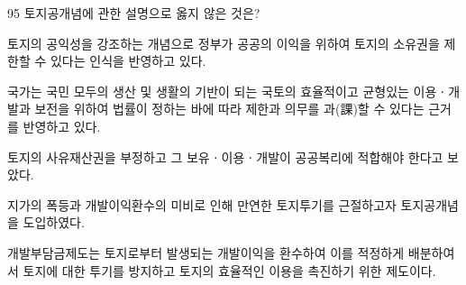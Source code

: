\begin{question}{95}
토지공개념에 관한 설명으로 옳지 않은 것은?
\begin{choices}
  \item 토지의 공익성을 강조하는 개념으로 정부가 공공의 이익을 위하여 토지의 소유권을 제한할 수 있다는 인식을 반영하고 있다.
  \item 국가는 국민 모두의 생산 및 생활의 기반이 되는 국토의 효율적이고 균형있는 이용ㆍ개발과 보전을 위하여 법률이 정하는 바에 따라 제한과 의무를 과(課)할 수 있다는 근거를 반영하고 있다.
  \item 토지의 사유재산권을 부정하고 그 보유ㆍ이용ㆍ개발이 공공복리에 적합해야 한다고 보았다.
  \item 지가의 폭등과 개발이익환수의 미비로 인해 만연한 토지투기를 근절하고자 토지공개념을 도입하였다.
  \item 개발부담금제도는 토지로부터 발생되는 개발이익을 환수하여 이를 적정하게 배분하여서 토지에 대한 투기를 방지하고 토지의 효율적인 이용을 촉진하기 위한 제도이다.
\end{choices}
\end{question}
